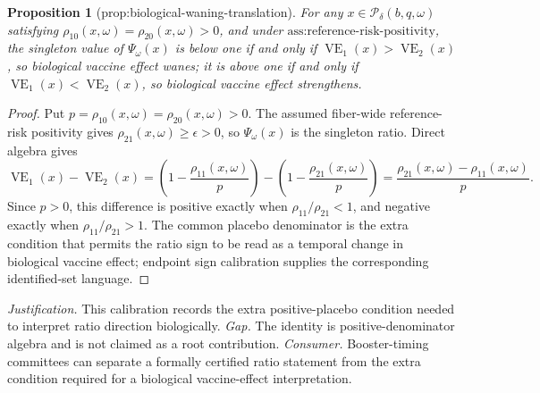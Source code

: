 \documentclass{article}
\newtheorem{proposition}{Proposition}
\begin{document}
\begin{proposition}[prop:biological-waning-translation]\label{prop:biological-waning-translation}
For any \(x\in\mathcal P_\delta(b,q,\omega)\) satisfying \(\rho_{10}(x,\omega)=\rho_{20}(x,\omega)>0\), and under \(\text{ass:reference-risk-positivity}\), the singleton value of \(\Psi_\omega(x)\) is below one if and only if \(\operatorname{VE}_1(x)>\operatorname{VE}_2(x)\), so biological vaccine effect wanes; it is above one if and only if \(\operatorname{VE}_1(x)<\operatorname{VE}_2(x)\), so biological vaccine effect strengthens.
\end{proposition}
\begin{proof}
Put \(p=\rho_{10}(x,\omega)=\rho_{20}(x,\omega)>0\).  The assumed fiber-wide reference-risk positivity gives \(\rho_{21}(x,\omega)\geq\epsilon>0\), so \(\Psi_\omega(x)\) is the singleton ratio.  Direct algebra gives
\[
\operatorname{VE}_1(x)-\operatorname{VE}_2(x)
=\left(1-\frac{\rho_{11}(x,\omega)}p\right)
-\left(1-\frac{\rho_{21}(x,\omega)}p\right)
=\frac{\rho_{21}(x,\omega)-\rho_{11}(x,\omega)}p.
\]
Since \(p>0\), this difference is positive exactly when \(\rho_{11}/\rho_{21}<1\), and negative exactly when \(\rho_{11}/\rho_{21}>1\).  The common placebo denominator is the extra condition that permits the ratio sign to be read as a temporal change in biological vaccine effect; endpoint sign calibration supplies the corresponding identified-set language.
\end{proof}
\par\smallskip\noindent \textit{Justification.} This calibration records the extra positive-placebo condition needed to interpret ratio direction biologically. \textit{Gap.} The identity is positive-denominator algebra and is not claimed as a root contribution. \textit{Consumer.} Booster-timing committees can separate a formally certified ratio statement from the extra condition required for a biological vaccine-effect interpretation.
\end{document}
